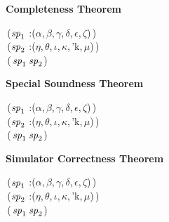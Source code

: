 \textbf{Completeness Theorem}
\begin{holmath}
    \,(\ensuremath{\HOLFreeVar{sp}\sb{\mathrm{1}}} :(\ensuremath{\alpha},\,\ensuremath{\beta},\,\ensuremath{\gamma},\,\ensuremath{\delta},\,\ensuremath{\epsilon},\,\ensuremath{\zeta})\,)\,\HOLSymConst{\HOLTokenConj{}}\\
\,(\ensuremath{\HOLFreeVar{sp}\sb{\mathrm{2}}} :(\ensuremath{\eta},\,\ensuremath{\theta},\,\ensuremath{\iota},\,\ensuremath{\kappa},\,'k,\,\ensuremath{\mu})\,)\,\HOLSymConst{\HOLTokenImp{}}\\
\,(\,\ensuremath{\HOLFreeVar{sp}\sb{\mathrm{1}}}\,\ensuremath{\HOLFreeVar{sp}\sb{\mathrm{2}}})
\end{holmath}  


\textbf{Special Soundness Theorem}
\begin{holmath}
    \,(\ensuremath{\HOLFreeVar{sp}\sb{\mathrm{1}}} :(\ensuremath{\alpha},\,\ensuremath{\beta},\,\ensuremath{\gamma},\,\ensuremath{\delta},\,\ensuremath{\epsilon},\,\ensuremath{\zeta})\,)\,\HOLSymConst{\HOLTokenConj{}}\\
\,(\ensuremath{\HOLFreeVar{sp}\sb{\mathrm{2}}} :(\ensuremath{\eta},\,\ensuremath{\theta},\,\ensuremath{\iota},\,\ensuremath{\kappa},\,'k,\,\ensuremath{\mu})\,)\,\HOLSymConst{\HOLTokenImp{}}\\
\,(\,\ensuremath{\HOLFreeVar{sp}\sb{\mathrm{1}}}\,\ensuremath{\HOLFreeVar{sp}\sb{\mathrm{2}}})
\end{holmath}  


\textbf{Simulator Correctness Theorem}
\begin{holmath}
    \,(\ensuremath{\HOLFreeVar{sp}\sb{\mathrm{1}}} :(\ensuremath{\alpha},\,\ensuremath{\beta},\,\ensuremath{\gamma},\,\ensuremath{\delta},\,\ensuremath{\epsilon},\,\ensuremath{\zeta})\,)\,\HOLSymConst{\HOLTokenConj{}}\\
\,(\ensuremath{\HOLFreeVar{sp}\sb{\mathrm{2}}} :(\ensuremath{\eta},\,\ensuremath{\theta},\,\ensuremath{\iota},\,\ensuremath{\kappa},\,'k,\,\ensuremath{\mu})\,)\,\HOLSymConst{\HOLTokenImp{}}\\
\,(\,\ensuremath{\HOLFreeVar{sp}\sb{\mathrm{1}}}\,\ensuremath{\HOLFreeVar{sp}\sb{\mathrm{2}}})
\end{holmath}  


